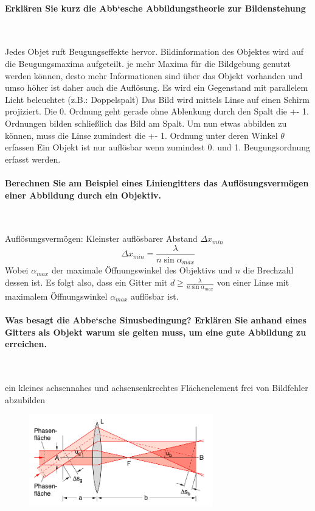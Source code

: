 \documentclass[a4paper, 11pt, ngerman, parskip=half]{scrartcl}
\begin{document}
\paragraph{Erklären Sie kurz die Abb‘esche Abbildungstheorie zur Bildenstehung} ~

Jedes Objet ruft Beugungseffekte hervor. Bildinformation des Objektes wird auf die Beugungsmaxima aufgeteilt. je mehr Maxima für die Bildgebung genutzt werden können, desto mehr Informationen sind über das Objekt vorhanden und umso höher ist daher auch die Auflösung.
Es wird ein Gegenstand mit parallelem Licht beleuchtet (z.B.: Doppelspalt)
Das Bild wird mittels Linse auf einen Schirm projiziert. Die 0. Ordnung geht gerade ohne Ablenkung durch den Spalt die +- 1. Ordnungen bilden schließlich das Bild am Spalt. Um nun etwas abbilden zu können, muss die Linse zumindest die +- 1. Ordnung unter deren Winkel $\theta$ erfassen
Ein Objekt ist nur auflösbar wenn zumindest 0. und 1. Beugungsordnung erfasst werden.

\paragraph{Berechnen Sie am Beispiel eines Liniengitters das Auflösungsvermögen einer Abbildung
durch ein Objektiv.} ~

Auflösungsvermögen: Kleinster auflösbarer Abstand $\Delta x_{min}$
\begin{equation}
    \Delta x_{min} = \frac{\lambda}{n \sin \alpha_{max}}
\end{equation}
Wobei $\alpha_{max}$ der maximale Öffnungswinkel des Objektivs und $n$ die Brechzahl dessen ist.
Es folgt also, dass ein Gitter mit $d \geq \frac{\lambda}{n \sin \alpha_{max}}$ von einer Linse mit maximalem Öffnungswinkel $\alpha_{max}$
auflösbar ist.

\paragraph{Was besagt die Abbe‘sche Sinusbedingung? Erklären Sie anhand eines Gitters als Objekt
warum sie gelten muss, um eine gute Abbildung zu erreichen.} ~

ein kleines achsennahes und achsensenkrechtes Flächenelement frei von Bildfehler abzubilden

\begin{figure}[H]
    \centering
    \includegraphics[width=8cm]{image/22/opt23} 
\end{figure}
\end{document}
